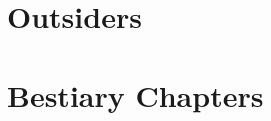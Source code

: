 \documentclass[a4paper,openany]{book}
\begin{document}
\chapter{Outsiders}

\begin{multicols}{2}

\archmage

\mindflayer

\mindflayer

\mindflayer

\archmage

\dragon

\rockman

\lavaman

\end{multicols}

\chapter{Bestiary Chapters}
\end{document}
